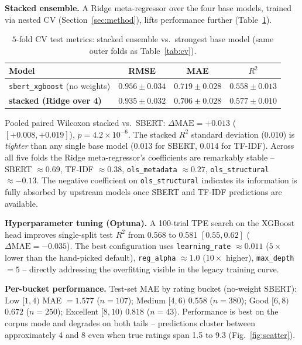 \documentclass[runningheads]{llncs}
\begin{document}
\noindent\textbf{Stacked ensemble.}
A Ridge meta-regressor over the four base models, trained via
nested CV (Section~\ref{sec:method}), lifts performance further
(Table~\ref{tab:stack}).

\begin{table}[t]
\caption{$5$-fold CV test metrics: stacked ensemble vs.\ strongest
base model (same outer folds as Table~\ref{tab:cv}).}\label{tab:stack}
\centering
\begin{tabular}{@{}lccc@{}}
\toprule
Model & RMSE & MAE & $R^{2}$ \\
\midrule
\texttt{sbert\_xgboost} (no weights) & $0.956 \pm 0.034$ & $0.719 \pm 0.028$ & $0.558 \pm 0.013$ \\
\textbf{stacked (Ridge over 4)}      & $\mathbf{0.935 \pm 0.032}$ & $\mathbf{0.706 \pm 0.028}$ & $\mathbf{0.577 \pm 0.010}$ \\
\bottomrule
\end{tabular}
\end{table}

Pooled paired Wilcoxon stacked vs.\ SBERT:
$\Delta\text{MAE} = +0.013$ ($[+0.008, +0.019]$),
$p = 4.2 \times 10^{-6}$. The stacked $R^{2}$ standard deviation
(0.010) is \emph{tighter} than any single base model (0.013 for
SBERT, 0.014 for TF-IDF). Across all five folds the Ridge
meta-regressor's coefficients are remarkably stable -- SBERT
$\approx 0.69$, TF-IDF $\approx 0.38$, \texttt{ols\_metadata}
$\approx 0.27$, \texttt{ols\_structural} $\approx -0.13$. The
negative coefficient on \texttt{ols\_structural} indicates its
information is fully absorbed by upstream models once SBERT and
TF-IDF predictions are available.

\noindent\textbf{Hyperparameter tuning (Optuna).}
A 100-trial TPE search on the XGBoost head improves single-split
test $R^{2}$ from 0.568 to 0.581 $[0.55, 0.62]$
($\Delta\text{MAE} = -0.035$). The best configuration uses
\texttt{learning\_rate} $\approx 0.011$ ($5\times$ lower than the
hand-picked default), \texttt{reg\_alpha} $\approx 1.0$
($10\times$ higher), \texttt{max\_depth}$=5$ -- directly
addressing the overfitting visible in the legacy training curve.

\noindent\textbf{Per-bucket performance.}
Test-set MAE by rating bucket (no-weight SBERT):
Low $[1, 4)$ MAE $= 1.577$ ($n = 107$);
Medium $[4, 6)$ $0.558$ ($n = 380$);
Good $[6, 8)$ $0.672$ ($n = 250$);
Excellent $[8, 10)$ $0.818$ ($n = 43$). Performance is best on
the corpus mode and degrades on both tails -- predictions cluster
between approximately 4 and 8 even when true ratings span 1.5 to
9.3 (Fig.~\ref{fig:scatter}).
\end{document}
